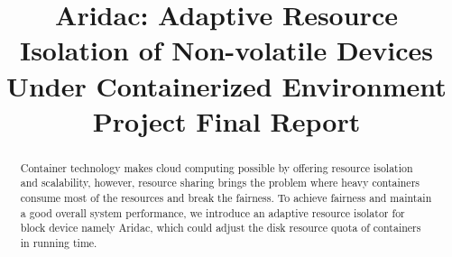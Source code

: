 \documentclass[10pt, conference,compsoc]{IEEEtran}
\begin{document}
%
\title{Aridac: Adaptive Resource Isolation of Non-volatile Devices \\Under  Containerized Environment \\ Project Final Report}


\author{
\and
{}
\and
{}
}






\maketitle

\begin{abstract}
Container technology makes cloud computing possible by offering resource isolation and scalability, however, resource sharing brings the problem where heavy containers consume most of the resources and break the fairness. To achieve fairness and maintain a good overall system performance, we introduce an adaptive resource isolator for block device namely Aridac, which could adjust the disk resource quota of containers in running time.
\end{abstract}
\end{document}
